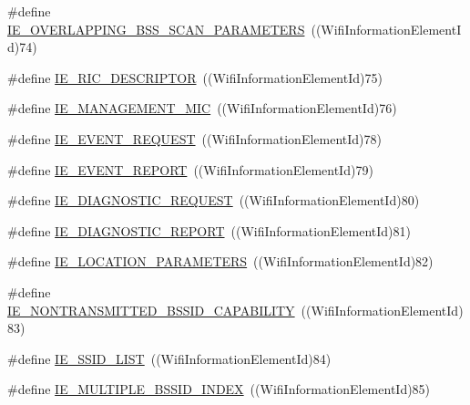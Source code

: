 \begin{DoxyCompactItemize}
\item 
\#define \hyperlink{wifi-information-element_8h_a64c93bb11fec80fa8de1cbfc05ae83e4}{I\+E\+\_\+\+O\+V\+E\+R\+L\+A\+P\+P\+I\+N\+G\+\_\+\+B\+S\+S\+\_\+\+S\+C\+A\+N\+\_\+\+P\+A\+R\+A\+M\+E\+T\+E\+RS}~((Wifi\+Information\+Element\+Id)74)
\item 
\#define \hyperlink{wifi-information-element_8h_a8e8d9100b8f092cbf6685d7de6c2cde3}{I\+E\+\_\+\+R\+I\+C\+\_\+\+D\+E\+S\+C\+R\+I\+P\+T\+OR}~((Wifi\+Information\+Element\+Id)75)
\item 
\#define \hyperlink{wifi-information-element_8h_a00a7addf3b04dd21c0f6a69a167678c4}{I\+E\+\_\+\+M\+A\+N\+A\+G\+E\+M\+E\+N\+T\+\_\+\+M\+IC}~((Wifi\+Information\+Element\+Id)76)
\item 
\#define \hyperlink{wifi-information-element_8h_a3981834de051f750baa6e1a65dd6bcc8}{I\+E\+\_\+\+E\+V\+E\+N\+T\+\_\+\+R\+E\+Q\+U\+E\+ST}~((Wifi\+Information\+Element\+Id)78)
\item 
\#define \hyperlink{wifi-information-element_8h_a74906f71abf1e1c7a8d9281eacfbd706}{I\+E\+\_\+\+E\+V\+E\+N\+T\+\_\+\+R\+E\+P\+O\+RT}~((Wifi\+Information\+Element\+Id)79)
\item 
\#define \hyperlink{wifi-information-element_8h_a2c16b173daf8e4a04aa54f527a31be02}{I\+E\+\_\+\+D\+I\+A\+G\+N\+O\+S\+T\+I\+C\+\_\+\+R\+E\+Q\+U\+E\+ST}~((Wifi\+Information\+Element\+Id)80)
\item 
\#define \hyperlink{wifi-information-element_8h_ad1a3acb74e3fa1cf7a9683da27847e09}{I\+E\+\_\+\+D\+I\+A\+G\+N\+O\+S\+T\+I\+C\+\_\+\+R\+E\+P\+O\+RT}~((Wifi\+Information\+Element\+Id)81)
\item 
\#define \hyperlink{wifi-information-element_8h_a91d2dbf32bc1fc7df3551fe9f8541330}{I\+E\+\_\+\+L\+O\+C\+A\+T\+I\+O\+N\+\_\+\+P\+A\+R\+A\+M\+E\+T\+E\+RS}~((Wifi\+Information\+Element\+Id)82)
\item 
\#define \hyperlink{wifi-information-element_8h_adf550d8fc84a582fcfdc1c3588852151}{I\+E\+\_\+\+N\+O\+N\+T\+R\+A\+N\+S\+M\+I\+T\+T\+E\+D\+\_\+\+B\+S\+S\+I\+D\+\_\+\+C\+A\+P\+A\+B\+I\+L\+I\+TY}~((Wifi\+Information\+Element\+Id)83)
\item 
\#define \hyperlink{wifi-information-element_8h_a8da9eff45bd2ada0e045f10a501ae877}{I\+E\+\_\+\+S\+S\+I\+D\+\_\+\+L\+I\+ST}~((Wifi\+Information\+Element\+Id)84)
\item 
\#define \hyperlink{wifi-information-element_8h_a9060c14539ff48742d39f372a1f56191}{I\+E\+\_\+\+M\+U\+L\+T\+I\+P\+L\+E\+\_\+\+B\+S\+S\+I\+D\+\_\+\+I\+N\+D\+EX}~((Wifi\+Information\+Element\+Id)85)
\item 

\end{DoxyCompactItemize}
